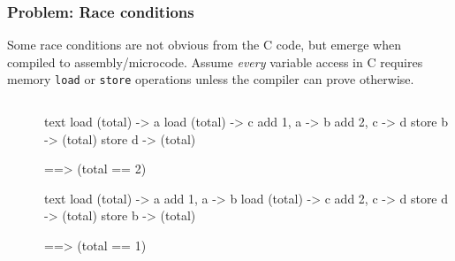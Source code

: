 \documentclass[]{beamer}
\begin{document}
\begin{frame}[fragile]
  \frametitle{Problem: Race conditions}
  Some race conditions are not obvious from the C code, but emerge when compiled to assembly/microcode. Assume \emph{every} variable access in C requires memory \texttt{load} or \texttt{store} operations unless the compiler can prove otherwise. 
  
  \begin{columns}[t]%
    \begin{column}{0.43\textwidth}
    \end{column}
    \pause

    \begin{column}{0.43\textwidth}
    \end{column}
    
    \begin{column}{0.3\textwidth}
      \begin{ccode}[after skip=4pt]
        {text}
        load (total) -> a
          load (total) -> c
        add 1, a -> b
          add 2, c -> d
        store b -> (total)
          store d -> (total)

          ==> (total == 2)\end{ccode}
      \begin{ccode}[]
        {text}
        load (total) -> a
        add 1, a -> b
          load (total) -> c
          add 2, c -> d
          store d -> (total)
        store b -> (total)
        
          ==> (total == 1)\end{ccode}
    \end{column}
  \end{columns}
\end{frame}
\end{document}
